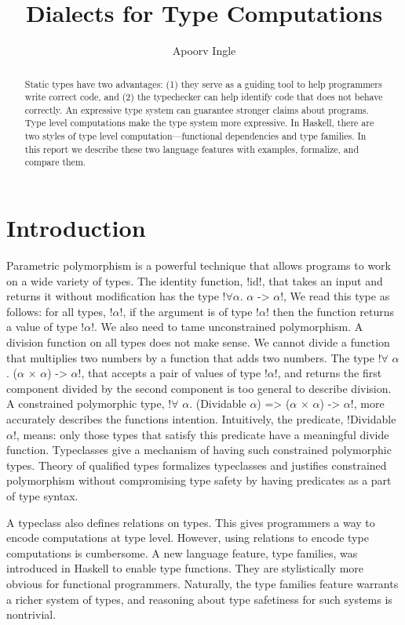 \documentclass[format=acmsmall,manuscript,review,screen,nonacm,margin=1in,11pt]{acmart}
\title{Dialects for Type Computations}
\author{Apoorv Ingle}
\affiliation{%
  \institution{University of Iowa}
  \department{Department of Computer Science}
  \streetaddress{McLean Hall}
  \city{Iowa City}
  \state{Iowa}
  \country{USA}}
\begin{document}
\begin{abstract}
  Static types have two advantages: (1) they serve as a guiding tool
  to help programmers write correct code, and (2) the typechecker
  can help identify code that does not behave correctly.
  An expressive type system can guarantee stronger claims about programs.
  Type level computations make the type system more expressive.
  In Haskell, there are two styles of type level computation---functional dependencies
  and type families. In this report we describe these two language features with examples,
  formalize, and compare them.
\end{abstract}
\maketitle

\section{Introduction}
Parametric polymorphism is a powerful technique that allows programs to work on
a wide variety of types. The identity function, !id!, that takes an input and returns it
without modification has the type !$\forall$$\alpha$. $\alpha$ -> $\alpha$!,
We read this type as follows: for all types, !$\alpha$!, if the argument is of type !$\alpha$!
then the function returns a value of type !$\alpha$!.
We also need to tame unconstrained polymorphism.
A division function on all types does not make sense. We cannot
divide a function that multiplies two numbers by a function that adds two numbers.
The type !$\forall$ $\alpha$. ($\alpha$ $\times$ $\alpha$) -> $\alpha$!, that accepts
a pair of values of type !$\alpha$!, and returns the first component divided by the
second component is too general to describe division. A constrained polymorphic type,
!$\forall$ $\alpha$. (Dividable $\alpha$) => ($\alpha$ $\times$ $\alpha$) -> $\alpha$!,
more accurately describes the functions intention. Intuitively, the predicate,
!Dividable $\alpha$!, means: only those types that satisfy this predicate
have a meaningful divide function. Typeclasses\cite{wadler_polymorphism_1989} give a mechanism
of having such constrained polymorphic types. Theory of qualified types\cite{jones_qualified_1994}
formalizes typeclasses and justifies constrained polymorphism
without compromising type safety by having predicates as a part of type syntax.

A typeclass also defines relations on types. This gives programmers a way to
encode computations at type level. However, using relations to encode type computations
is cumbersome. A new language feature, type families\cite{schrijvers_towards_2007}, was introduced in Haskell
to enable type functions. They are stylistically more obvious for functional programmers.
Naturally, the type families feature warrants a richer system of types, and reasoning about type safetiness
for such systems is nontrivial.
\end{document}
